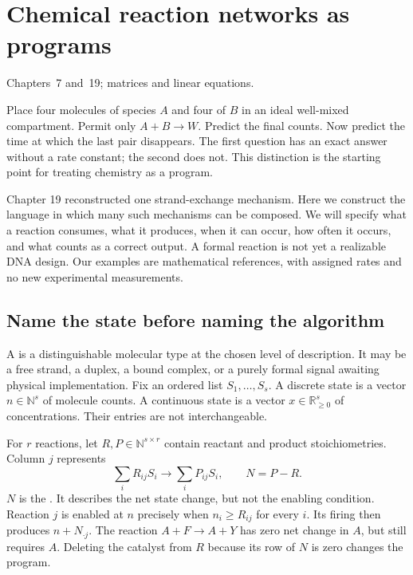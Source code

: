 \chapter{Chemical reaction networks as programs}
{Chapters~7 and~19; matrices and linear equations.}

Place four molecules of species $A$ and four of $B$ in an ideal well-mixed
compartment. Permit only $A+B\rightarrow W$. Predict the final counts.
Now predict the time at which the last pair disappears. The first question
has an exact answer without a rate constant; the second does not.
This distinction is the starting point for treating chemistry as a program.

Chapter 19 reconstructed one strand-exchange mechanism. Here we construct
the language in which many such mechanisms can be composed. We will specify
what a reaction consumes, what it produces, when it can occur, how often it
occurs, and what counts as a correct output. A formal reaction is not yet
a realizable DNA design. Our examples are mathematical references, with
assigned rates and no new experimental measurements.

\section{Name the state before naming the algorithm}

A  is a distinguishable molecular type at the chosen level of
description. It may be a free strand, a duplex, a bound complex, or a purely
formal signal awaiting physical implementation. Fix an ordered list
$S_1,\ldots,S_s$. A discrete state is a vector
$n\in\mathbb N^s$ of molecule counts. A continuous state is a vector
$x\in\mathbb R_{\geq0}^s$ of concentrations. Their entries are not interchangeable.

For $r$ reactions, let $R,P\in\mathbb N^{s\times r}$ contain reactant and product
stoichiometries. Column $j$ represents
\begin{equation}
 \sum_i R_{ij}S_i\longrightarrow\sum_i P_{ij}S_i,\qquad
 N=P-R .
 \label{eq:stoich}
\end{equation}
$N$ is the . It describes the net state change,
but not the enabling condition. Reaction $j$ is enabled at $n$ precisely when
$n_i\geq R_{ij}$ for every $i$. Its firing then produces $n+N_{\cdot j}$.
The reaction $A+F\rightarrow A+Y$ has zero net change in $A$, but still
requires $A$. Deleting the catalyst from $R$ because its row of $N$ is zero
changes the program.

